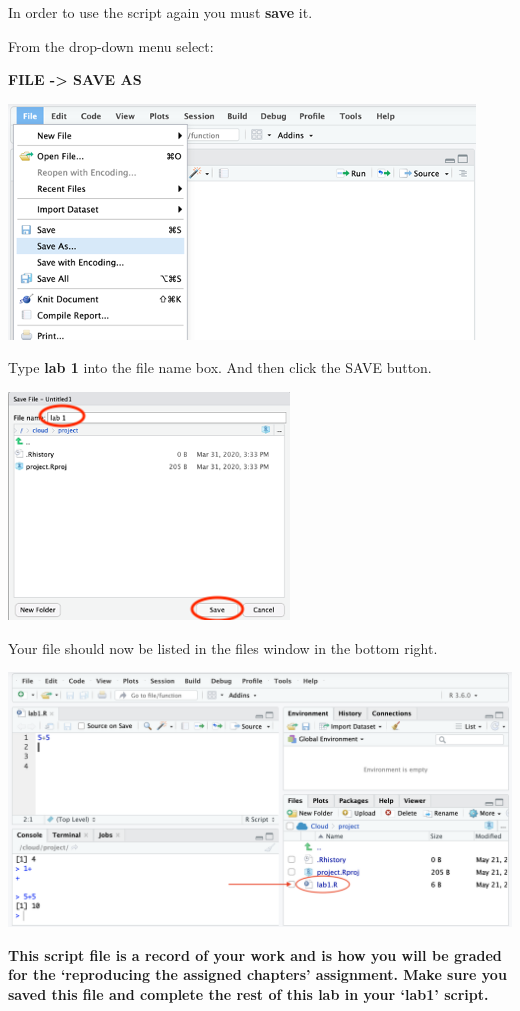 \documentclass[
]{book}
\begin{document}
In order to use the script again you must \textbf{save} it.

From the drop-down menu select:

\textbf{FILE -\textgreater{} SAVE AS}

\includegraphics{img/savescript.png}

Type \textbf{lab 1} into the file name box. And then click the SAVE button.

\includegraphics{img/savescript2.png}

Your file should now be listed in the files window in the bottom right.

\includegraphics{img/savescript3.png}

\textbf{This script file is a record of your work and is how you will be graded for the `reproducing the assigned chapters' assignment. Make sure you saved this file and complete the rest of this lab in your `lab1' script.}
\end{document}
